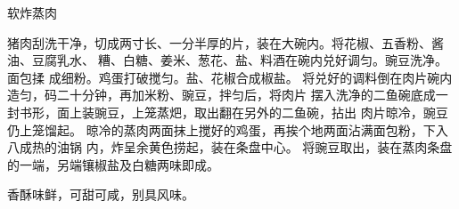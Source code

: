 \begin{recipe}{软炸蒸肉}

\ingredients


\preparation

\step 猪肉刮洗干净，切成两寸长、一分半厚的片，装在大碗内。将花椒、五香粉、酱
油、豆腐乳水、𫃑糟、白糖、姜米、葱花、盐、料酒在碗内兑好调匀。豌豆洗净。面包揉
成细粉。鸡蛋打破搅匀。盐、花椒合成椒盐。
\step 将兑好的调料倒在肉片碗内造匀，码二十分钟，再加米粉、豌豆，拌匀后，将肉片
摆入洗净的二鱼碗底成一封书形，面上装豌豆，上笼蒸𤆵，取出翻在另外的二鱼碗，拈出
肉片晾冷，豌豆仍上笼馏起。
\step 晾冷的蒸肉两面抹上搅好的鸡蛋，再挨个地两面沾满面包粉，下入八成热的油锅
内，炸呈余黄色捞起，装在条盘中心。
\step 将豌豆取出，装在蒸肉条盘的一端，另端镶椒盐及白糖两味即成。

\features

香酥味鲜，可甜可咸，别具风味。

\end{recipe}

